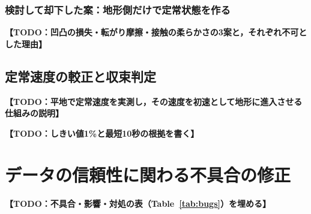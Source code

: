 \documentclass[uplatex,dvipdfmx]{jsarticle}
\newcommand{\todo}[1]{\textbf{【TODO：#1】}}
\begin{document}
\subsubsection{検討して却下した案：地形側だけで定常状態を作る}
\todo{凹凸の損失・転がり摩擦・接触の柔らかさの3案と，それぞれ不可とした理由}

\subsection{定常速度の較正と収束判定}
\todo{平地で定常速度を実測し，その速度を初速として地形に進入させる仕組みの説明}

\begin{table}[t!]
    \caption{Convergence criteria for steady speed}
    \label{tab:steady_criteria}
    \centering
\end{table}

\todo{しきい値1\%と最短10秒の根拠を書く}

\section{データの信頼性に関わる不具合の修正}
\todo{不具合・影響・対処の表（Table~\ref{tab:bugs}）を埋める}
\end{document}
